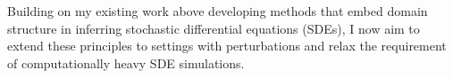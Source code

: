
Building on my existing work above developing methods that embed domain structure in inferring stochastic differential equations (SDEs), I now aim to extend these principles to settings with perturbations and relax the requirement of computationally heavy SDE simulations. 